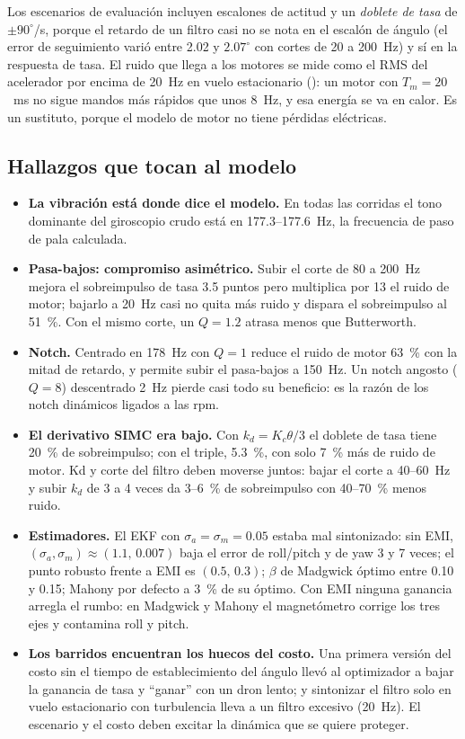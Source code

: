Los escenarios de evaluación incluyen escalones de actitud y un
\emph{doblete de tasa} de $\pm90^\circ$/s, porque el retardo de un filtro casi
no se nota en el escalón de ángulo (el error de seguimiento varió entre
2.02 y $2.07^\circ$ con cortes de 20 a 200~Hz) y sí en la respuesta de tasa.
El ruido que llega a los motores se mide como el RMS del acelerador por
encima de 20~Hz en vuelo estacionario (): un motor con
$T_m=20$~ms no sigue mandos más rápidos que unos 8~Hz, y esa energía se va
en calor. Es un sustituto, porque el modelo de motor no tiene pérdidas
eléctricas.

\subsection{Hallazgos que tocan al modelo}

\begin{itemize}
\item \textbf{La vibración está donde dice el modelo.} En todas las corridas
el tono dominante del giroscopio crudo está en 177.3--177.6~Hz, la
frecuencia de paso de pala calculada.
\item \textbf{Pasa-bajos: compromiso asimétrico.} Subir el corte de 80 a
200~Hz mejora el sobreimpulso de tasa 3.5 puntos pero multiplica por 13 el
ruido de motor; bajarlo a 20~Hz casi no quita más ruido y dispara el
sobreimpulso al 51~\%. Con el mismo corte, un $Q=1.2$ atrasa menos que
Butterworth.
\item \textbf{Notch.} Centrado en 178~Hz con $Q=1$ reduce el ruido de motor
63~\% con la mitad de retardo, y permite subir el pasa-bajos a 150~Hz. Un
notch angosto ($Q=8$) descentrado 2~Hz pierde casi todo su beneficio: es la
razón de los notch dinámicos ligados a las rpm.
\item \textbf{El derivativo SIMC era bajo.} Con $k_d=K_c\theta/3$ el doblete
de tasa tiene 20~\% de sobreimpulso; con el triple, 5.3~\%, con solo 7~\% más
de ruido de motor. Kd y corte del filtro deben moverse juntos: bajar el
corte a 40--60~Hz y subir $k_d$ de 3 a 4 veces da 3--6~\% de sobreimpulso
con 40--70~\% menos ruido.
\item \textbf{Estimadores.} El EKF con $\sigma_a=\sigma_m=0.05$ estaba mal
sintonizado: sin EMI, $(\sigma_a,\sigma_m)\approx(1.1,\,0.007)$ baja el error
de roll/pitch y de yaw 3 y 7 veces; el punto robusto frente a EMI es
$(0.5,\,0.3)$; $\beta$ de Madgwick óptimo entre
0.10 y 0.15; Mahony por defecto a 3~\% de su óptimo. Con EMI ninguna
ganancia arregla el rumbo: en Madgwick y Mahony el magnetómetro corrige los
tres ejes y contamina roll y pitch.
\item \textbf{Los barridos encuentran los huecos del costo.} Una primera
versión del costo sin el tiempo de establecimiento del ángulo llevó al
optimizador a bajar la ganancia de tasa y ``ganar'' con un dron lento; y
sintonizar el filtro solo en vuelo estacionario con turbulencia lleva a un
filtro excesivo (20~Hz). El escenario y el costo deben excitar la dinámica
que se quiere proteger.
\end{itemize}

